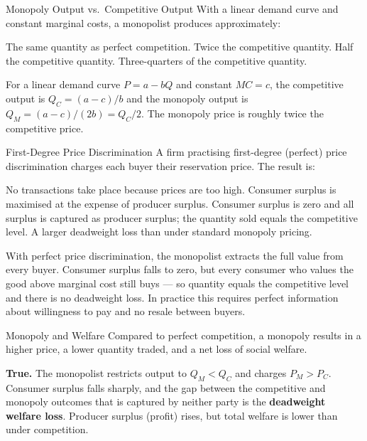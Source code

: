 \documentclass[paper=a5]{scrartcl}
\begin{document}
\begin{question}[type=mc]{Monopoly Output vs.\ Competitive Output}
With a linear demand curve and constant marginal costs, a monopolist produces
approximately:
\begin{choices}
  \choice        The same quantity as perfect competition.
  \choice        Twice the competitive quantity.
  \correctchoice Half the competitive quantity.
  \choice        Three-quarters of the competitive quantity.
\end{choices}
\begin{solution}
  For a linear demand curve $P = a - bQ$ and constant $MC = c$, the
  competitive output is $Q_C = (a-c)/b$ and the monopoly output is
  $Q_M = (a-c)/(2b) = Q_C/2$. The monopoly price is roughly twice the
  competitive price.
\end{solution}
\end{question}

\begin{question}[type=mc]{First-Degree Price Discrimination}
A firm practising first-degree (perfect) price discrimination charges each
buyer their reservation price. The result is:
\begin{choices}
  \choice        No transactions take place because prices are too high.
  \choice        Consumer surplus is maximised at the expense of producer surplus.
  \correctchoice Consumer surplus is zero and all surplus is captured as
                 producer surplus; the quantity sold equals the competitive level.
  \choice        A larger deadweight loss than under standard monopoly pricing.
\end{choices}
\begin{solution}
  With perfect price discrimination, the monopolist extracts the full value from
  every buyer. Consumer surplus falls to zero, but every consumer who values
  the good above marginal cost still buys — so quantity equals the competitive
  level and there is no deadweight loss. In practice this requires perfect
  information about willingness to pay and no resale between buyers.
\end{solution}
\end{question}

\begin{question}[type=tf]{Monopoly and Welfare}
Compared to perfect competition, a monopoly results in a higher price, a lower
quantity traded, and a net loss of social welfare.
\truefalse[true]
\begin{solution}
  \textbf{True.} The monopolist restricts output to $Q_M < Q_C$ and charges
  $P_M > P_C$. Consumer surplus falls sharply, and the gap between the
  competitive and monopoly outcomes that is captured by neither party is the
  \textbf{deadweight welfare loss}. Producer surplus (profit) rises, but total
  welfare is lower than under competition.
\end{solution}
\end{question}
\end{document}
